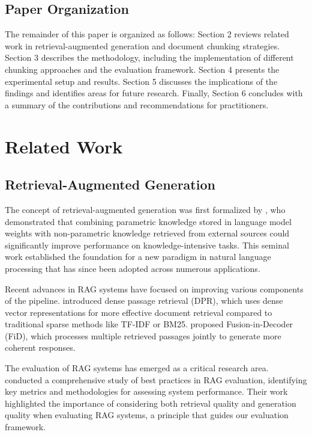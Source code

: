 \documentclass[11pt,a4paper]{article}
\begin{document}
\subsection{Paper Organization}

The remainder of this paper is organized as follows: Section 2 reviews related work in retrieval-augmented generation and document chunking strategies. Section 3 describes the methodology, including the implementation of different chunking approaches and the evaluation framework. Section 4 presents the experimental setup and results. Section 5 discusses the implications of the findings and identifies areas for future research. Finally, Section 6 concludes with a summary of the contributions and recommendations for practitioners.

\section{Related Work}

\subsection{Retrieval-Augmented Generation}

The concept of retrieval-augmented generation was first formalized by \citet{lewis2020retrieval}, who demonstrated that combining parametric knowledge stored in language model weights with non-parametric knowledge retrieved from external sources could significantly improve performance on knowledge-intensive tasks. This seminal work established the foundation for a new paradigm in natural language processing that has since been adopted across numerous applications.

Recent advances in RAG systems have focused on improving various components of the pipeline. \citet{karpukhin2020dense} introduced dense passage retrieval (DPR), which uses dense vector representations for more effective document retrieval compared to traditional sparse methods like TF-IDF or BM25. \citet{izacard2021leveraging} proposed Fusion-in-Decoder (FiD), which processes multiple retrieved passages jointly to generate more coherent responses.

The evaluation of RAG systems has emerged as a critical research area. \citet{wang2024searching} conducted a comprehensive study of best practices in RAG evaluation, identifying key metrics and methodologies for assessing system performance. Their work highlighted the importance of considering both retrieval quality and generation quality when evaluating RAG systems, a principle that guides our evaluation framework.
\end{document}
